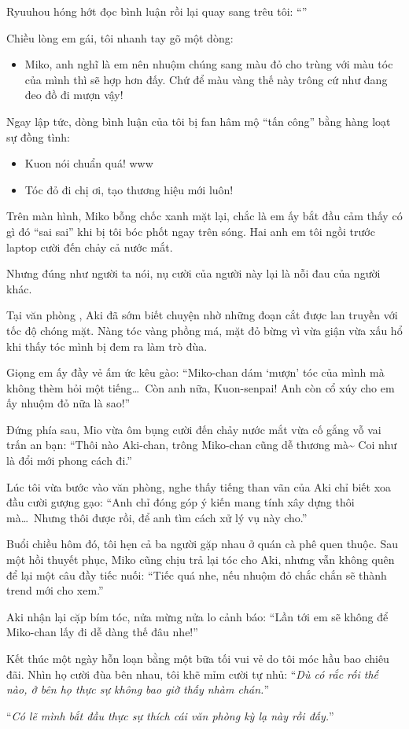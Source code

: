 \documentclass[../main.tex]{subfiles}
\begin{document}
Ryuuhou hóng hớt đọc bình luận rồi lại quay sang trêu tôi: ``''

Chiều lòng em gái, tôi nhanh tay gõ một dòng:
\begin{itemize}
  \item Miko, anh nghĩ là em nên nhuộm chúng sang màu đỏ cho trùng với màu tóc của mình thì sẽ hợp hơn đấy. Chứ để màu vàng thế này trông cứ như đang đeo đồ đi mượn vậy!
\end{itemize}

Ngay lập tức, dòng bình luận của tôi bị fan hâm mộ ``tấn công'' bằng hàng loạt sự đồng tình:
\begin{itemize}
  \item Kuon nói chuẩn quá! www
  \item Tóc đỏ đi chị ơi, tạo thương hiệu mới luôn!
\end{itemize}

Trên màn hình, Miko bỗng chốc xanh mặt lại, chắc là em ấy bắt đầu cảm thấy có gì đó ``sai sai'' khi bị tôi bóc phốt ngay trên sóng. Hai anh em tôi ngồi trước laptop cười đến chảy cả nước mắt.

Nhưng đúng như người ta nói, nụ cười của người này lại là nỗi đau của người khác.

\ct


Tại văn phòng \hll, Aki đã sớm biết chuyện nhờ những đoạn cắt được lan truyền với tốc độ chóng mặt. Nàng tóc vàng phồng má, mặt đỏ bừng vì vừa giận vừa xấu hổ khi thấy tóc mình bị đem ra làm trò đùa.

Giọng em ấy đầy vẻ ấm ức kêu gào: ``Miko-chan dám `mượn' tóc của mình mà không thèm hỏi một tiếng\dots\ Còn anh nữa, Kuon-senpai! Anh còn cổ xúy cho em ấy nhuộm đỏ nữa là sao!''

Đứng phía sau, Mio vừa ôm bụng cười đến chảy nước mắt vừa cố gắng vỗ vai trấn an bạn: ``Thôi nào Aki-chan, trông Miko-chan cũng dễ thương mà\~{} Coi như là đổi mới phong cách đi.''

Lúc tôi vừa bước vào văn phòng, nghe thấy tiếng than vãn của Aki chỉ biết xoa đầu cười gượng gạo: ``Anh chỉ đóng góp ý kiến mang tính xây dựng thôi mà\dots\ Nhưng thôi được rồi, để anh tìm cách xử lý vụ này cho.''

\ct

Buổi chiều hôm đó, tôi hẹn cả ba người gặp nhau ở quán cà phê quen thuộc. Sau một hồi thuyết phục, Miko cũng chịu trả lại tóc cho Aki, nhưng vẫn không quên để lại một câu đầy tiếc nuối: ``Tiếc quá nhe, nếu nhuộm đỏ chắc chắn sẽ thành trend mới cho xem.''

Aki nhận lại cặp bím tóc, nửa mừng nửa lo cảnh báo: ``Lần tới em sẽ không để Miko-chan lấy đi dễ dàng thế đâu nhe!''

Kết thúc một ngày hỗn loạn bằng một bữa tối vui vẻ do tôi móc hầu bao chiêu đãi. Nhìn họ cười đùa bên nhau, tôi khẽ mỉm cười tự nhủ: ``\textit{Dù có rắc rối thế nào, ở bên họ thực sự không bao giờ thấy nhàm chán.}''

``\textit{Có lẽ mình bắt đầu thực sự thích cái văn phòng kỳ lạ này rồi đấy.}''
\end{document}
